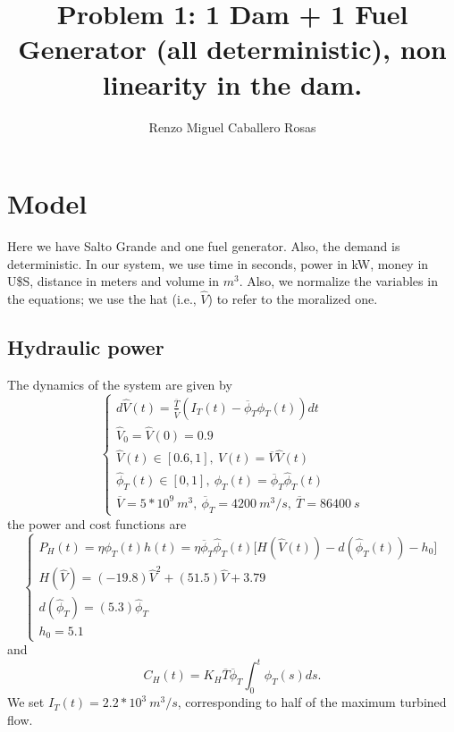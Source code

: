 \documentclass[12pt]{article}
\theoremstyle{definition}
\theoremstyle{remark}
\begin{document}
\title{Problem 1: 1 Dam + 1 Fuel Generator (all deterministic), non linearity in the dam.}
\author{Renzo Miguel Caballero Rosas} 
\maketitle

\pagebreak
\tableofcontents
\pagebreak

\section{Model}

Here we have Salto Grande and one fuel generator. Also, the demand is deterministic. In our system, we use time in seconds, power in kW, money in U\$S, distance in meters and volume in $m^3$. Also, we normalize the variables in the equations; we use the hat (i.e., $\hat{V}$) to refer to the moralized one.

\subsection{Hydraulic power}

The dynamics of the system are given by
\begin{equation*}
\begin{cases}
d\hat{V}(t)=\frac{\overline{T}}{\overline{V}}(I_T(t)-\overline{\phi}_T\hat{\phi}_T(t))dt\\
\hat{V}_0=\hat{V}(0)=0.9\\
\hat{V}(t)\in[0.6,1],\ V(t)=\overline{V}\hat{V}(t)\\
\hat{\phi}_T(t)\in[0,1],\ \phi_T(t)=\overline{\phi}_T\hat{\phi}_T(t)\\
\overline{V}=5*10^9\ m^3,\ \overline{\phi}_T=4200\ m^3/s,\ \overline{T}=86400\ s
\end{cases}
\end{equation*}
the power and cost functions are
\begin{equation*}
\begin{cases}
P_H(t)=\eta\phi_T(t)h(t)=\eta\overline{\phi}_T\hat{\phi}_T(t)\Big[H(\hat{V}(t))-d(\hat{\phi}_T(t))-h_0\Big]\\
H(\hat{V})=(-19.8)\hat{V}^2+(51.5)\hat{V}+3.79\\
d(\hat{\phi}_T)=(5.3)\hat{\phi}_T\\
h_0=5.1
\end{cases}
\end{equation*}
and
\begin{equation*}
C_H(t)=K_H\overline{T}\overline{\phi}_T\int_0^t\hat{\phi}_T(s)ds.
\end{equation*}
We set $I_T(t)=2.2*10^3\ m^3/s$, corresponding to half of the maximum turbined flow.
\end{document}
